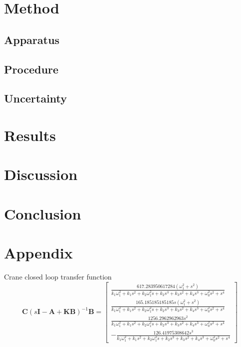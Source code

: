 \documentclass{article}
\begin{document}
\section{Method}

\subsection{Apparatus}


\subsection{Procedure}


\subsection{Uncertainty}



\section{Results}


\section{Discussion}



\section{Conclusion}


\newpage
\section{Appendix}

Crane closed loop transfer function
\begin{equation}
  \mathbf{C} (s\mathbf{I} - \mathbf{A} + \mathbf{KB}) ^{-1} \mathbf{B} = \left[\begin{matrix}\frac{617.283950617284 \left(\omega_{1}^{2} + s^{2}\right)}{k_{1} \omega_{1}^{2} + k_{1} s^{2} + k_{2} \omega_{1}^{2} s + k_{2} s^{3} + k_{3} s^{2} + k_{4} s^{3} + \omega_{0}^{2} s^{2} + s^{4}}\\\frac{165.185185185185 s \left(\omega_{1}^{2} + s^{2}\right)}{k_{1} \omega_{1}^{2} + k_{1} s^{2} + k_{2} \omega_{1}^{2} s + k_{2} s^{3} + k_{3} s^{2} + k_{4} s^{3} + \omega_{0}^{2} s^{2} + s^{4}}\\\frac{1256.2962962963 s^{2}}{k_{1} \omega_{1}^{2} + k_{1} s^{2} + k_{2} \omega_{1}^{2} s + k_{2} s^{3} + k_{3} s^{2} + k_{4} s^{3} + \omega_{0}^{2} s^{2} + s^{4}}\\- \frac{126.41975308642 s^{3}}{k_{1} \omega_{1}^{2} + k_{1} s^{2} + k_{2} \omega_{1}^{2} s + k_{2} s^{3} + k_{3} s^{2} + k_{4} s^{3} + \omega_{0}^{2} s^{2} + s^{4}}\end{matrix}\right]
\end{equation}
\end{document}
